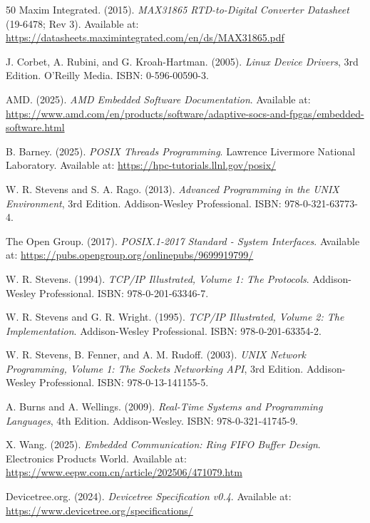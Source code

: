 \documentclass[11pt, a4paper]{report}
\begin{document}
\begin{thebibliography}{50}
Maxim Integrated. (2015). \textit{MAX31865 RTD-to-Digital Converter Datasheet} (19-6478; Rev 3). Available at: \url{https://datasheets.maximintegrated.com/en/ds/MAX31865.pdf}

J. Corbet, A. Rubini, and G. Kroah-Hartman. (2005). \textit{Linux Device Drivers}, 3rd Edition. O'Reilly Media. ISBN: 0-596-00590-3.

AMD. (2025). \textit{AMD Embedded Software Documentation}. Available at: \url{https://www.amd.com/en/products/software/adaptive-socs-and-fpgas/embedded-software.html}

B. Barney. (2025). \textit{POSIX Threads Programming}. Lawrence Livermore National Laboratory. Available at: \url{https://hpc-tutorials.llnl.gov/posix/}

W. R. Stevens and S. A. Rago. (2013). \textit{Advanced Programming in the UNIX Environment}, 3rd Edition. Addison-Wesley Professional. ISBN: 978-0-321-63773-4.

The Open Group. (2017). \textit{POSIX.1-2017 Standard - System Interfaces}. Available at: \url{https://pubs.opengroup.org/onlinepubs/9699919799/}

W. R. Stevens. (1994). \textit{TCP/IP Illustrated, Volume 1: The Protocols}. Addison-Wesley Professional. ISBN: 978-0-201-63346-7.

W. R. Stevens and G. R. Wright. (1995). \textit{TCP/IP Illustrated, Volume 2: The Implementation}. Addison-Wesley Professional. ISBN: 978-0-201-63354-2.

W. R. Stevens, B. Fenner, and A. M. Rudoff. (2003). \textit{UNIX Network Programming, Volume 1: The Sockets Networking API}, 3rd Edition. Addison-Wesley Professional. ISBN: 978-0-13-141155-5.

A. Burns and A. Wellings. (2009). \textit{Real-Time Systems and Programming Languages}, 4th Edition. Addison-Wesley. ISBN: 978-0-321-41745-9.

X. Wang. (2025). \textit{Embedded Communication: Ring FIFO Buffer Design}. Electronics Products World. Available at: \url{https://www.eepw.com.cn/article/202506/471079.htm}

Devicetree.org. (2024). \textit{Devicetree Specification v0.4}. Available at: \url{https://www.devicetree.org/specifications/}


\end{thebibliography}
\end{document}
